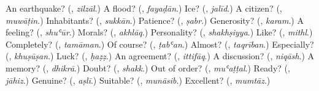\begin{tcolorbox}[breakable,colback=teal!4,colframe=teal!35!black,title={Before you move on}]
An earthquake? (\textbf{}, \emph{zilzāl}.) A flood? (\textbf{}, \emph{fayaḍān}.) Ice? (\textbf{}, \emph{jalīd}.) A citizen? (\textbf{}, \emph{muwāṭin}.) Inhabitants? (\textbf{}, \emph{sukkān}.) Patience? (\textbf{}, \emph{ṣabr}.) Generosity? (\textbf{}, \emph{karam}.) A feeling? (\textbf{}, \emph{shuʿūr}.) Morals? (\textbf{}, \emph{akhlāq}.) Personality? (\textbf{}, \emph{shakhṣiyya}.) Like? (\textbf{}, \emph{mithl}.) Completely? (\textbf{}, \emph{tamāman}.) Of course? (\textbf{}, \emph{ṭabʿan}.) Almost? (\textbf{}, \emph{taqrīban}.) Especially? (\textbf{}, \emph{khuṣūṣan}.) Luck? (\textbf{}, \emph{ḥaẓẓ}.) An agreement? (\textbf{}, \emph{ittifāq}.) A discussion? (\textbf{}, \emph{niqāsh}.) A memory? (\textbf{}, \emph{dhikrā}.) Doubt? (\textbf{}, \emph{shakk}.) Out of order? (\textbf{}, \emph{muʿaṭṭal}.) Ready? (\textbf{}, \emph{jāhiz}.) Genuine? (\textbf{}, \emph{aṣlī}.) Suitable? (\textbf{}, \emph{munāsib}.) Excellent? (\textbf{}, \emph{mumtāz}.)
\end{tcolorbox}
